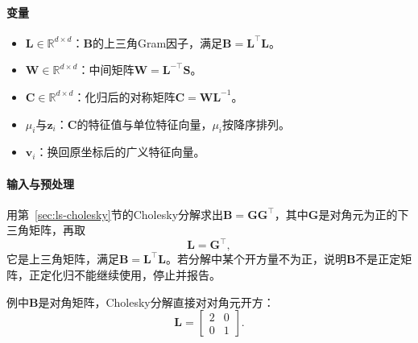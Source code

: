 \paragraph{变量}
\begin{itemize}
 \item $\bm L\in\mathbb R^{d\times d}$：$\bm B$的上三角Gram因子，满足$\bm B=\bm L^\top\bm L$。
 \item $\bm W\in\mathbb R^{d\times d}$：中间矩阵$\bm W=\bm L^{-\top}\bm S$。
 \item $\bm C\in\mathbb R^{d\times d}$：化归后的对称矩阵$\bm C=\bm W\bm L^{-1}$。
 \item $\mu_i$与$\bm z_i$：$\bm C$的特征值与单位特征向量，$\mu_i$按降序排列。
 \item $\bm v_i$：换回原坐标后的广义特征向量。
\end{itemize}

\paragraph{输入与预处理}
用第~\ref{sec:ls-cholesky}节的Cholesky分解求出$\bm B=\bm G\bm G^\top$，其中$\bm G$是对角元为正的下三角矩阵，再取
\[
 \bm L=\bm G^\top ,
\]
它是上三角矩阵，满足$\bm B=\bm L^\top\bm L$。若分解中某个开方量不为正，说明$\bm B$不是正定矩阵，正定化归不能继续使用，停止并报告。

例中$\bm B$是对角矩阵，Cholesky分解直接对对角元开方：
\[
 \bm L=\begin{bmatrix}2&0\\0&1\end{bmatrix}.
\]

